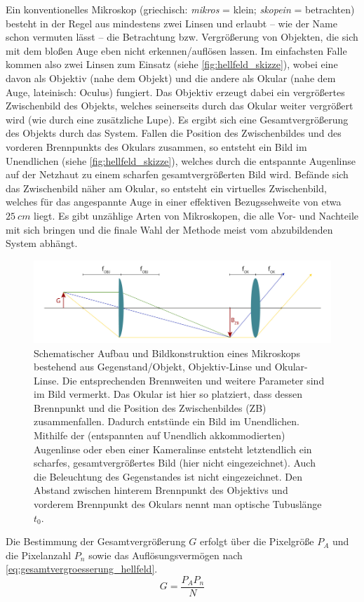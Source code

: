 \documentclass[ngerman]{scrartcl}
\begin{document}
Ein konventionelles Mikroskop (griechisch: \textit{mikros} = klein; \textit{skopein} = betrachten) besteht in der Regel aus mindestens zwei Linsen und erlaubt -- wie der Name schon vermuten lässt -- die Betrachtung bzw. Vergrößerung von Objekten, die sich mit dem bloßen Auge eben nicht erkennen/auflösen lassen. Im einfachsten Falle kommen also zwei Linsen zum Einsatz (siehe \autoref{fig:hellfeld_skizze}), wobei eine davon als Objektiv (nahe dem Objekt) und die andere als Okular (nahe dem Auge, lateinisch: Oculus) fungiert. Das Objektiv erzeugt dabei ein vergrößertes Zwischenbild des Objekts, welches seinerseits durch das Okular weiter vergrößert wird (wie durch eine zusätzliche Lupe). Es ergibt sich eine Gesamtvergrößerung des Objekts durch das System. Fallen die Position des Zwischenbildes und des vorderen Brennpunkts des Okulars zusammen, so entsteht ein Bild im Unendlichen (siehe \autoref{fig:hellfeld_skizze}), welches durch die entspannte Augenlinse auf der Netzhaut zu einem scharfen gesamtvergrößerten Bild wird. Befände sich das Zwischenbild näher am Okular, so entsteht ein virtuelles Zwischenbild, welches für das angespannte Auge in einer effektiven Bezugssehweite von etwa $\SI{25}{cm}$ liegt. Es gibt unzählige Arten von Mikroskopen, die alle Vor- und Nachteile mit sich bringen und die finale Wahl der Methode meist vom abzubildenden System abhängt.
%
\begin{figure}[H]
    \centering
    \begin{samepage}
        \includegraphics[width=\linewidth]{fig/Hellfeld.png}
        \caption[Aufbau eines Hellfeld-Transmissionsmikroskops]{Schematischer Aufbau und Bildkonstruktion eines Mikroskops bestehend aus Gegenstand/Objekt, Objektiv-Linse und Okular-Linse. Die entsprechenden Brennweiten und weitere Parameter sind im Bild vermerkt. Das Okular ist hier so platziert, dass dessen Brennpunkt und die Position des Zwischenbildes (ZB) zusammenfallen. Dadurch entstünde ein Bild im Unendlichen. Mithilfe der (entspannten auf Unendlich akkommodierten) Augenlinse oder eben einer Kameralinse entsteht letztendlich ein scharfes, gesamtvergrößertes Bild (hier nicht eingezeichnet). Auch die Beleuchtung des Gegenstandes ist nicht eingezeichnet. Den Abstand zwischen hinterem Brennpunkt des Objektivs und vorderem Brennpunkt des Okulars nennt man optische Tubuslänge $t_0$.}
        \label{fig:hellfeld_skizze}
    \end{samepage}
\end{figure}
%
Die Bestimmung der Gesamtvergrößerung $G$ erfolgt über die Pixelgröße $P_A$ und die Pixelanzahl $P_n$ sowie das Auflösungsvermögen nach \autoref{eq:gesamtvergroesserung_hellfeld}.
%
\begin{equation}
    \label{eq:gesamtvergroesserung_hellfeld}
    G = \frac{P_A P_n}{N}
\end{equation}
\end{document}
